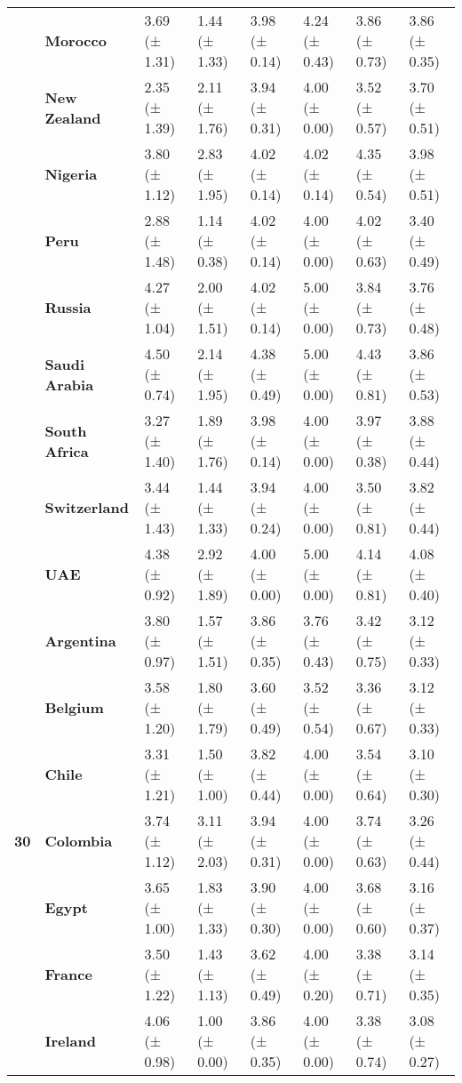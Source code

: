 \begin{tabular}{llllllll}
\textbf{} & \textbf{Morocco} & 3.69 (± 1.31) & 1.44 (± 1.33) & 3.98 (± 0.14) & 4.24 (± 0.43) & 3.86 (± 0.73) & 3.86 (± 0.35) \\
\textbf{} & \textbf{New Zealand} & 2.35 (± 1.39) & 2.11 (± 1.76) & 3.94 (± 0.31) & 4.00 (± 0.00) & 3.52 (± 0.57) & 3.70 (± 0.51) \\
\textbf{} & \textbf{Nigeria} & 3.80 (± 1.12) & 2.83 (± 1.95) & 4.02 (± 0.14) & 4.02 (± 0.14) & 4.35 (± 0.54) & 3.98 (± 0.51) \\
\textbf{} & \textbf{Peru} & 2.88 (± 1.48) & 1.14 (± 0.38) & 4.02 (± 0.14) & 4.00 (± 0.00) & 4.02 (± 0.63) & 3.40 (± 0.49) \\
\textbf{} & \textbf{Russia} & 4.27 (± 1.04) & 2.00 (± 1.51) & 4.02 (± 0.14) & 5.00 (± 0.00) & 3.84 (± 0.73) & 3.76 (± 0.48) \\
\textbf{} & \textbf{Saudi Arabia} & 4.50 (± 0.74) & 2.14 (± 1.95) & 4.38 (± 0.49) & 5.00 (± 0.00) & 4.43 (± 0.81) & 3.86 (± 0.53) \\
\textbf{} & \textbf{South Africa} & 3.27 (± 1.40) & 1.89 (± 1.76) & 3.98 (± 0.14) & 4.00 (± 0.00) & 3.97 (± 0.38) & 3.88 (± 0.44) \\
\textbf{} & \textbf{Switzerland} & 3.44 (± 1.43) & 1.44 (± 1.33) & 3.94 (± 0.24) & 4.00 (± 0.00) & 3.50 (± 0.81) & 3.82 (± 0.44) \\
\textbf{} & \textbf{UAE} & 4.38 (± 0.92) & 2.92 (± 1.89) & 4.00 (± 0.00) & 5.00 (± 0.00) & 4.14 (± 0.81) & 4.08 (± 0.40) \\
\cline{1-8}
\multirow[t]{19}{*}{\textbf{30}} & \textbf{Argentina} & 3.80 (± 0.97) & 1.57 (± 1.51) & 3.86 (± 0.35) & 3.76 (± 0.43) & 3.42 (± 0.75) & 3.12 (± 0.33) \\
\textbf{} & \textbf{Belgium} & 3.58 (± 1.20) & 1.80 (± 1.79) & 3.60 (± 0.49) & 3.52 (± 0.54) & 3.36 (± 0.67) & 3.12 (± 0.33) \\
\textbf{} & \textbf{Chile} & 3.31 (± 1.21) & 1.50 (± 1.00) & 3.82 (± 0.44) & 4.00 (± 0.00) & 3.54 (± 0.64) & 3.10 (± 0.30) \\
\textbf{} & \textbf{Colombia} & 3.74 (± 1.12) & 3.11 (± 2.03) & 3.94 (± 0.31) & 4.00 (± 0.00) & 3.74 (± 0.63) & 3.26 (± 0.44) \\
\textbf{} & \textbf{Egypt} & 3.65 (± 1.00) & 1.83 (± 1.33) & 3.90 (± 0.30) & 4.00 (± 0.00) & 3.68 (± 0.60) & 3.16 (± 0.37) \\
\textbf{} & \textbf{France} & 3.50 (± 1.22) & 1.43 (± 1.13) & 3.62 (± 0.49) & 4.00 (± 0.20) & 3.38 (± 0.71) & 3.14 (± 0.35) \\
\textbf{} & \textbf{Ireland} & 4.06 (± 0.98) & 1.00 (± 0.00) & 3.86 (± 0.35) & 4.00 (± 0.00) & 3.38 (± 0.74) & 3.08 (± 0.27) \\

\end{tabular}
